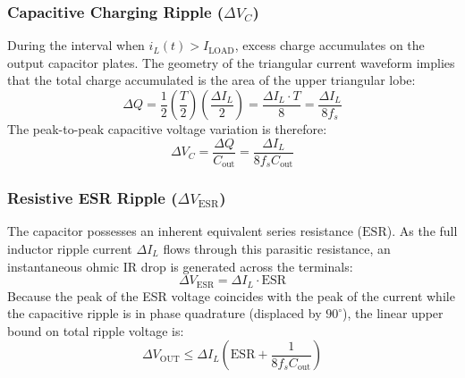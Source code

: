 \documentclass[12pt,a4paper]{article}
\newcommand{\Vout}{V_{\mathrm{OUT}}}
\newcommand{\Iload}{I_{\mathrm{LOAD}}}
\newcommand{\dI}{\Delta I_L}
\newcommand{\fs}{f_s}
\newcommand{\ESR}{\mathrm{ESR}}
\begin{document}
\subsubsection{Capacitive Charging Ripple \texorpdfstring{($\Delta V_{C}$)}{(Delta VC)}}
During the interval when $i_L(t) > \Iload$, excess charge accumulates on the output capacitor plates. The geometry of the triangular current waveform implies that the total charge accumulated is the area of the upper triangular lobe:
\begin{equation}
    \Delta Q = \frac{1}{2} \left(\frac{T}{2}\right) \left(\frac{\dI}{2}\right) = \frac{\dI \cdot T}{8} = \frac{\dI}{8 \fs}
\end{equation}
The peak-to-peak capacitive voltage variation is therefore:
\begin{equation}
    \Delta V_{C} = \frac{\Delta Q}{C_{\mathrm{out}}} = \frac{\dI}{8 \fs C_{\mathrm{out}}}
    \label{eq:dvc}
\end{equation}

\subsubsection{Resistive ESR Ripple \texorpdfstring{($\Delta V_{\mathrm{ESR}}$)}{(Delta VESR)}}
The capacitor possesses an inherent equivalent series resistance ($\ESR$). As the full inductor ripple current $\dI$ flows through this parasitic resistance, an instantaneous ohmic IR drop is generated across the terminals:
\begin{equation}
    \Delta V_{\mathrm{ESR}} = \dI \cdot \ESR
    \label{eq:dvesr}
\end{equation}
Because the peak of the ESR voltage coincides with the peak of the current while the capacitive ripple is in phase quadrature (displaced by $90^\circ$), the linear upper bound on total ripple voltage is:
\begin{equation}
    \Delta \Vout \le \dI \left( \ESR + \frac{1}{8 \fs C_{\mathrm{out}}} \right)
    \label{eq:total_ripple}
\end{equation}
\end{document}

